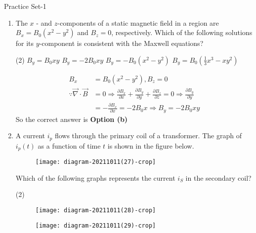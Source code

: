 
\begin{abox}
	Practice Set-1
\end{abox}
\begin{enumerate}
	\item The $x$ - and $z$-components of a static magnetic field in a region are $B_{x}=B_{0}\left(x^{2}-y^{2}\right)$ and $B_{z}=0$, respectively. Which of the following solutions for its $y$-component is consistent with the Maxwell equations?
	{}
	\begin{tasks}(2)
		\task[\textbf{a.}]$B_{y}=B_{0} x y$
		\task[\textbf{b.}]$B_{y}=-2 B_{0} x y$
		\task[\textbf{c.}] $B_{y}=-B_{0}\left(x^{2}-y^{2}\right)$
		\task[\textbf{d.}]  $B_{y}=B_{0}\left(\frac{1}{3} x^{3}-x y^{2}\right)$
	\end{tasks}
\begin{answer}
	\begin{align*}
	B_{x}&=B_{0}\left(x^{2}-y^{2}\right), B_{z}=0\\
	\because \vec{\nabla} \cdot \vec{B}&=0 \Rightarrow \frac{\partial B_{x}}{\partial x}+\frac{\partial B_{y}}{\partial y}+\frac{\partial B_{z}}{\partial z}=0 \Rightarrow \frac{\partial B_{y}}{\partial y}\\&=-\frac{\partial B_{x}}{\partial x}=-2 B_{0} x \Rightarrow B_{y}=-2 B_{0} x y
	\end{align*}
	So the correct answer is \textbf{Option (b)}
\end{answer}
	\item A current $i_{p}$ flows through the primary coil of a transformer. The graph of $i_{p}(t)$ as a function of time $t$ is shown in the figure below.\\
	\begin{figure}[H]
		\centering
		\texttt{[image: diagram-20211011(27)-crop]}
	\end{figure}
	Which of the following graphs represents the current $i_{S}$ in the secondary coil?
	{}
	\begin{tasks}(2)
		\task[\textbf{a.}] \begin{figure}[H]
			\centering
			\texttt{[image: diagram-20211011(28)-crop]}
		\end{figure}
		\task[\textbf{b.}] \begin{figure}[H]
			\centering
			\texttt{[image: diagram-20211011(29)-crop]}
		\end{figure}
		\task[\textbf{c.}] \begin{figure}[H]

\end{figure}
\end{tasks}
\end{enumerate}
